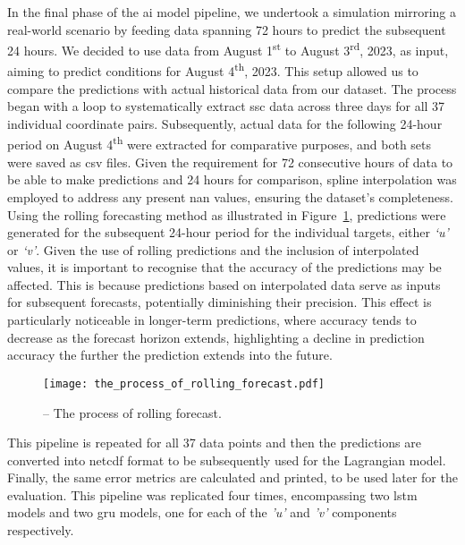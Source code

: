 In the final phase of the \acrshort{ai} model pipeline, we undertook a simulation mirroring a real-world scenario by feeding data spanning 72 hours to predict the subsequent 24 hours. We decided to use data from August 1\textsuperscript{st} to August 3\textsuperscript{rd}, 2023, as input, aiming to predict conditions for August 4\textsuperscript{th}, 2023. This setup allowed us to compare the predictions with actual historical data from our dataset. The process began with a loop to systematically extract \acrshort{ssc} data across three days for all 37 individual coordinate pairs. Subsequently, actual data for the following 24-hour period on August 4\textsuperscript{th} were extracted for comparative purposes, and both sets were saved as \acrshort{csv} files. Given the requirement for 72 consecutive hours of data to be able to make predictions and 24 hours for comparison, spline interpolation was employed to address any present \acrshort{nan} values, ensuring the dataset's completeness. Using the rolling forecasting method as illustrated in Figure~\ref{fig_3.7}, predictions were generated for the subsequent 24-hour period for the individual targets, either \textit{‘u’} or \textit{‘v’}. Given the use of rolling predictions and the inclusion of interpolated values, it is important to recognise that the accuracy of the predictions may be affected. This is because predictions based on interpolated data serve as inputs for subsequent forecasts, potentially diminishing their precision. This effect is particularly noticeable in longer-term predictions, where accuracy tends to decrease as the forecast horizon extends, highlighting a decline in prediction accuracy the further the prediction extends into the future.

\begin{figure}[htbp]
    \centering
    \texttt{[image: the\_process\_of\_rolling\_forecast.pdf]}
    \caption[The process of rolling forecast.]{-- The process of rolling forecast.\label{fig_3.7}}
\end{figure}

This pipeline is repeated for all 37 data points and then the predictions are converted into \acrshort{netcdf} format to be subsequently used for the Lagrangian model. Finally, the same error metrics are calculated and printed, to be used later for the evaluation. This pipeline was replicated four times, encompassing two \acrshort{lstm} models and two \acrshort{gru} models, one for each of the \textit{'u'} and \textit{'v'} components respectively.


